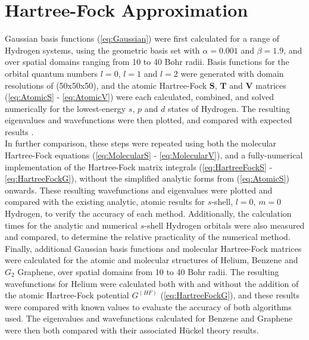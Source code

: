 \section{Hartree-Fock Approximation}\label{sec:hartreemethod}

Gaussian basis functions (\ref{eq:Gaussian}) were first calculated for a range of Hydrogen systems, using the geometric basis set with $\alpha=0.001$ and $\beta=1.9$, and over spatial domains ranging from 10 to 40 Bohr radii. Basis functions for the orbital quantum numbers $l=0$, $l=1$ and $l=2$ were generated with domain resolutions of (50x50x50), and the atomic Hartree-Fock $\boldsymbol{S}$, $\boldsymbol{T}$ and $\boldsymbol{V}$ matrices (\ref{eq:AtomicS} - \ref{eq:AtomicV}) were each calculated, combined, and solved numerically for the lowest-energy $s$, $p$ and $d$ states of Hydrogen. The resulting eigenvalues and wavefunctions were then plotted, and compared with expected results \cite{walczak_hydrogen_2013}.\\

In further comparison, these steps were repeated using both the molecular Hartree-Fock equations (\ref{eq:MolecularS} - \ref{eq:MolecularV}), and a fully-numerical implementation of the Hartree-Fock matrix integrals (\ref{eq:HartreeFockS} - \ref{eq:HartreeFockG}), without the simplified analytic forms from (\ref{eq:AtomicS}) onwards. These resulting wavefunctions and eigenvalues were plotted and compared with the existing analytic, atomic results for $s$-shell, $l=0$, $m=0$ Hydrogen, to verify the accuracy of each method. Additionally, the calculation times for the analytic and numerical $s$-shell Hydrogen orbitals were also measured and compared, to determine the relative practicality of the numerical method.\\

Finally, additional Gaussian basis functions and molecular Hartree-Fock matrices were calculated for the atomic and molecular structures of Helium, Benzene and $G_2$ Graphene, over spatial domains from 10 to 40 Bohr radii. The resulting wavefunctions for Helium were calculated both with and without the addition of the atomic Hartree-Fock potential $G^{(HF)}$ (\ref{eq:HartreeFockG}), and these results were compared with known values \cite{nascimento_determination_2005} to evaluate the accuracy of both algorithms used. The eigenvalues and wavefunctions calculated for Benzene and Graphene were then both compared with their associated Hückel theory results.